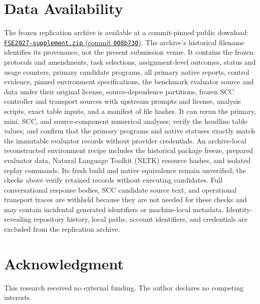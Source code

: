 \section*{Data Availability}
\aieditnote
The frozen replication archive is available at a commit-pinned public download:
\href{https://github.com/daniil-novel/article-INoT/raw/008b730a905277079710092ecf3881770eb100fc/submission/fse2027/upload/FSE2027-supplement.zip}{\texttt{FSE2027-supplement.zip} (commit \texttt{008b730})}.
The archive's historical filename identifies its provenance, not the present submission venue. It contains the frozen protocols and amendments, task selections, assignment-level outcomes, status and usage counters, primary candidate programs, all primary native reports, control evidence, pinned environment specifications, the benchmark evaluator source and data under their original license, source-dependence partitions, frozen SCC controller and transport sources with upstream prompts and license, analysis scripts, exact table inputs, and a manifest of file hashes. It can rerun the primary, mini, SCC, and source-component numerical analyses; verify the headline table values; and confirm that the primary programs and native statuses exactly match the immutable evaluator records without provider credentials. An archive-local reconstructed environment recipe includes the historical package freeze, prepared evaluator data, Natural Language Toolkit (NLTK) resource hashes, and isolated replay commands. Its fresh build and native equivalence remain unverified; the checks above verify retained records without executing candidates. Full conversational response bodies, SCC candidate source text, and operational transport traces are withheld because they are not needed for these checks and may contain incidental generated identifiers or machine-local metadata. Identity-revealing repository history, local paths, account identifiers, and credentials are excluded from the replication archive.

\section*{Acknowledgment}
This research received no external funding. The author declares no competing interests.

